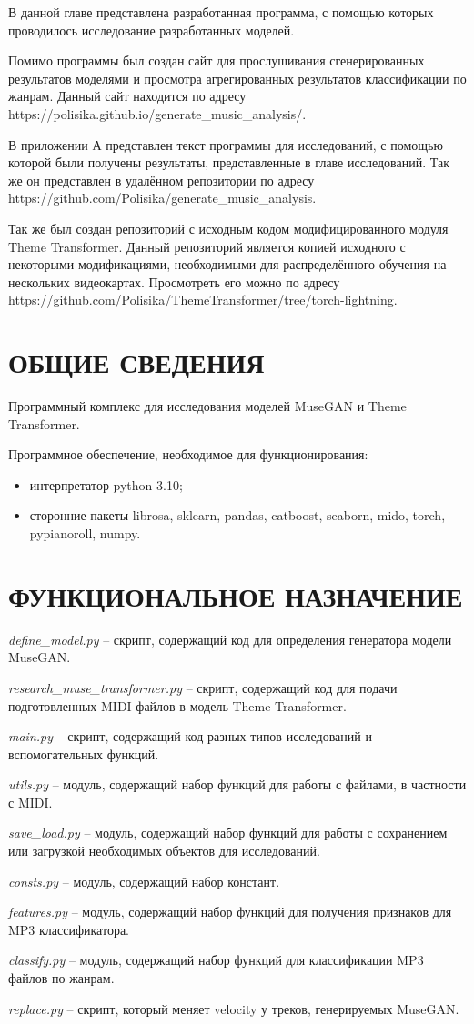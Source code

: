 В данной главе представлена разработанная программа, с помощью которых проводилось исследование разработанных моделей.

Помимо программы был создан сайт для прослушивания сгенерированных результатов моделями и просмотра агрегированных результатов классификации по жанрам. Данный сайт находится по адресу https://polisika.github.io/generate\_music\_analysis/.

В приложении А представлен текст программы для исследований, с помощью которой были получены результаты, представленные в главе исследований. Так же он представлен в удалённом репозитории по адресу https://github.com/Polisika/generate\_music\_analysis.

Так же был создан репозиторий с исходным кодом модифицированного модуля Theme Transformer. Данный репозиторий является копией исходного с некоторыми модификациями, необходимыми для распределённого обучения на нескольких видеокартах. Просмотреть его можно по адресу https://github.com/Polisika/ThemeTransformer/tree/torch-lightning.

\section{ОБЩИЕ СВЕДЕНИЯ}
Программный комплекс для исследования моделей MuseGAN и Theme Transformer.

Программное обеспечение, необходимое для функционирования: 
\begin{itemize}
    \item интерпретатор python 3.10;
    \item сторонние пакеты librosa, sklearn, pandas, catboost, seaborn, mido, torch, pypianoroll, numpy.
\end{itemize}

\section{ФУНКЦИОНАЛЬНОЕ НАЗНАЧЕНИЕ}

\emph{define\_model.py} -- скрипт, содержащий код для определения генератора модели MuseGAN.

\emph{research\_muse\_transformer.py} -- скрипт, содержащий код для подачи подготовленных MIDI-файлов в модель Theme Transformer.

\emph{main.py} -- скрипт, содержащий код разных типов исследований и вспомогательных функций.

\emph{utils.py} -- модуль, содержащий набор функций для работы с файлами, в частности с MIDI.

\emph{save\_load.py} -- модуль, содержащий набор функций для работы с сохранением или загрузкой необходимых объектов для исследований.

\emph{consts.py} -- модуль, содержащий набор констант.

\emph{features.py} -- модуль, содержащий набор функций для получения признаков для MP3 классификатора.

\emph{classify.py} -- модуль, содержащий набор функций для классификации MP3 файлов по жанрам.

\emph{replace.py} -- скрипт, который меняет velocity у треков, генерируемых MuseGAN.
